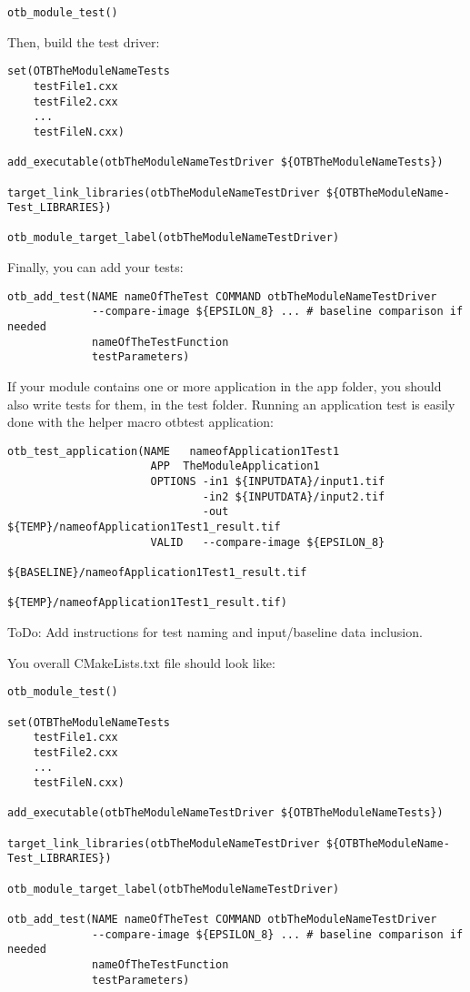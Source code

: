 \begin{verbatim}
otb_module_test()
\end{verbatim}

Then, build the test driver: 

\begin{verbatim}
set(OTBTheModuleNameTests
    testFile1.cxx
    testFile2.cxx
    ...
    testFileN.cxx)

add_executable(otbTheModuleNameTestDriver ${OTBTheModuleNameTests})

target_link_libraries(otbTheModuleNameTestDriver ${OTBTheModuleName-Test_LIBRARIES})
 
otb_module_target_label(otbTheModuleNameTestDriver)
\end{verbatim}

Finally, you can add your tests: 

\begin{verbatim}
otb_add_test(NAME nameOfTheTest COMMAND otbTheModuleNameTestDriver
             --compare-image ${EPSILON_8} ... # baseline comparison if needed
             nameOfTheTestFunction
             testParameters)
\end{verbatim}

If your module contains one or more application in the app folder, you should
also write tests for them, in the test folder. Running an application test is
easily done with the helper macro otb\textunderscore test\textunderscore
application:

\begin{verbatim}
otb_test_application(NAME   nameofApplication1Test1
                      APP  TheModuleApplication1
                      OPTIONS -in1 ${INPUTDATA}/input1.tif
                              -in2 ${INPUTDATA}/input2.tif
                              -out ${TEMP}/nameofApplication1Test1_result.tif
                      VALID   --compare-image ${EPSILON_8}
                              ${BASELINE}/nameofApplication1Test1_result.tif
                              ${TEMP}/nameofApplication1Test1_result.tif)
\end{verbatim}

ToDo: Add instructions for test naming and input/baseline data inclusion.

You overall CMakeLists.txt file should look like: 

\begin{verbatim}
otb_module_test()

set(OTBTheModuleNameTests
    testFile1.cxx
    testFile2.cxx
    ...
    testFileN.cxx)

add_executable(otbTheModuleNameTestDriver ${OTBTheModuleNameTests})

target_link_libraries(otbTheModuleNameTestDriver ${OTBTheModuleName-Test_LIBRARIES})
 
otb_module_target_label(otbTheModuleNameTestDriver)

otb_add_test(NAME nameOfTheTest COMMAND otbTheModuleNameTestDriver
             --compare-image ${EPSILON_8} ... # baseline comparison if needed
             nameOfTheTestFunction
             testParameters)
\end{verbatim}

